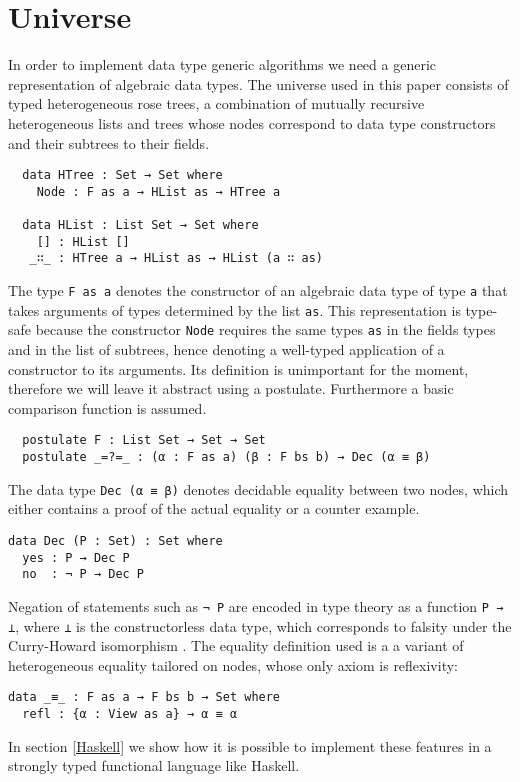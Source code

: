 \documentclass[preprint]{sigplanconf}
\begin{document}
\section{Universe}
In order to implement data type generic algorithms we need a generic representation of algebraic data types.
The universe used in this paper consists of typed heterogeneous rose trees,
a combination of mutually recursive heterogeneous lists and trees
whose nodes correspond to data type constructors and their subtrees
to their fields.
\begin{verbatim}
  data HTree : Set → Set where
    Node : F as a → HList as → HTree a

  data HList : List Set → Set where
    [] : HList []
   _∷_ : HTree a → HList as → HList (a ∷ as)
\end{verbatim}
	The type \texttt{F as a} denotes the constructor of an algebraic data
	type of type \texttt{a} that takes arguments of types determined by the list 
	\texttt{as}. This representation is type-safe because the constructor
	\texttt{Node} requires the same types \texttt{as} in the fields types and in 
	the list of subtrees, hence denoting a 	well-typed application of a 
	constructor to its arguments.
	Its definition is unimportant for the moment, therefore we will leave it
	abstract using a postulate. Furthermore a basic comparison
	function is assumed.
\begin{verbatim}
  postulate F : List Set → Set → Set 
  postulate _=?=_ : (α : F as a) (β : F bs b) → Dec (α ≡ β)
\end{verbatim}	
	The data type \texttt{Dec (α ≡ β)} denotes decidable equality between
	two nodes, which either contains a proof of the actual equality
	or a counter example.
\begin{verbatim}
data Dec (P : Set) : Set where
  yes : P → Dec P
  no  : ¬ P → Dec P
\end{verbatim}
	Negation of statements such as \texttt{¬ P} are encoded in type theory as
	a function \texttt{P → ⊥}, where \texttt{⊥} is
	the constructorless data type, which corresponds to falsity 
	under the Curry-Howard isomorphism \cite{PropositionAsTypes}.
	The equality definition used is a a variant of heterogeneous equality
	tailored on nodes, whose only axiom is reflexivity:
\begin{verbatim}
data _≡_ : F as a → F bs b → Set where
  refl : {α : View as a} → α ≡ α
\end{verbatim}

	In section \ref{Haskell} we show how it is possible to implement these 
	features in a strongly typed functional language like Haskell.
	
\end{document}
